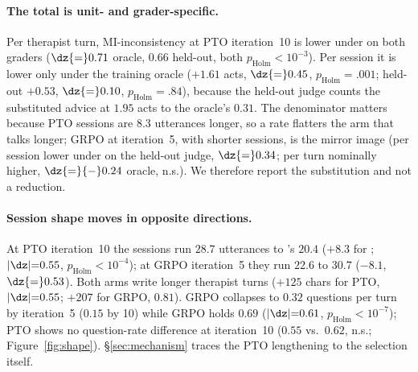 \paragraph{The total is unit- and grader-specific.} Per therapist turn, MI-inconsistency at PTO
iteration~10 is lower under \Kf{} on both graders ($\dz{=}0.71$ oracle, $0.66$ held-out, both
$p_{\text{Holm}}{<}10^{-3}$). Per session it is lower only under the training oracle ($+1.61$
acts, $\dz{=}0.45$, $p_{\text{Holm}}{=}.001$; held-out $+0.53$, $\dz{=}0.10$,
$p_{\text{Holm}}{=}.84$), because the held-out judge counts the substituted advice at $1.95$
acts to the oracle's $0.31$. The denominator matters because \Kf{} PTO sessions are $8.3$
utterances longer, so a rate flatters the arm that talks longer; GRPO at iteration~5, with
shorter \Kf{} sessions, is the mirror image (per session lower under \Kf{} on the held-out
judge, $\dz{=}0.34$; per turn nominally higher, $\dz{=}{-}0.24$ oracle, n.s.). We therefore
report the substitution and not a reduction.

\paragraph{Session shape moves in opposite directions.} At PTO iteration~10 the \Kf{} sessions
run $28.7$ utterances to \Kz{}'s $20.4$ ($+8.3$ for \Kf{}; $|\dz|{=}0.55$,
$p_{\text{Holm}}{<}10^{-4}$); at GRPO iteration~5 they run $22.6$ to $30.7$ ($-8.1$,
$\dz{=}0.53$). Both \Kf{} arms write longer therapist turns ($+125$ chars for PTO,
$|\dz|{=}0.55$; $+207$ for GRPO, $0.81$). GRPO \Kz{} collapses to $0.32$ questions per turn by
iteration~5 ($0.15$ by 10) while GRPO \Kf{} holds $0.69$ ($|\dz|{=}0.61$,
$p_{\text{Holm}}{<}10^{-7}$); PTO shows no question-rate difference at iteration~10 ($0.55$ vs.\
$0.62$, n.s.; Figure~\ref{fig:shape}). \S\ref{sec:mechanism} traces the PTO lengthening to the
selection itself.

